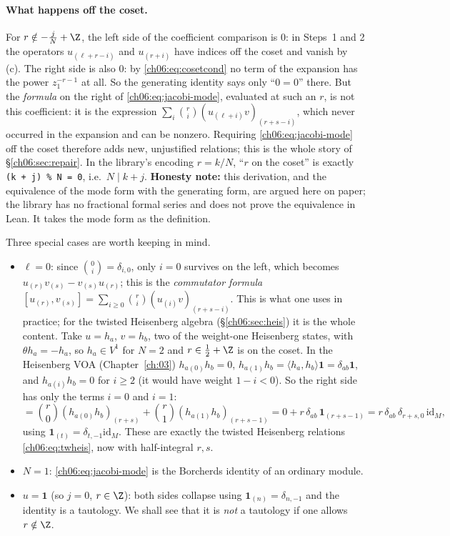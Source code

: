 \paragraph{What happens off the coset.}  For $r\notin-\frac jN+\Z$, the left side of the
coefficient comparison is $0$: in Steps~1 and 2 the operators $u_{(\ell+r-i)}$ and $u_{(r+i)}$ have
indices off the coset and vanish by (c).  The right side is also $0$: by
\eqref{ch06:eq:cosetcond} no term of the expansion has the power $z_1^{-r-1}$ at all.  So the
generating identity says only ``$0=0$'' there.  But the \emph{formula} on the right of
\eqref{ch06:eq:jacobi-mode}, evaluated at such an $r$, is not this coefficient: it is the
expression $\sum_i\binom ri(u_{(\ell+i)}v)_{(r+s-i)}$, which never occurred in the expansion and
can be nonzero.  Requiring \eqref{ch06:eq:jacobi-mode} off the coset therefore adds new,
unjustified relations; this is the whole story of \S\ref{ch06:sec:repair}.  In the library's
encoding $r=k/N$, ``$r$ on the coset'' is exactly \texttt{(k + j) \% N = 0}, i.e.\ $N\mid k+j$.
\textbf{Honesty note:} this derivation, and the equivalence of the mode form with the generating
form, are argued here on paper; the library has no fractional formal series and does not prove the
equivalence in Lean.  It takes the mode form as the definition.

Three special cases are worth keeping in mind.
\begin{itemize}
\item $\ell=0$: since $\binom0i=\delta_{i,0}$, only $i=0$ survives on the left, which becomes
  $u_{(r)}v_{(s)}-v_{(s)}u_{(r)}$; this is the \emph{commutator formula}
  $[u_{(r)},v_{(s)}]=\sum_{i\ge0}\binom ri(u_{(i)}v)_{(r+s-i)}$.  This is what one uses in
  practice; for the twisted Heisenberg algebra (\S\ref{ch06:sec:heis}) it is the whole content.
  Take $u=h_a$, $v=h_b$, two of the weight-one Heisenberg states, with $\theta h_a=-h_a$, so
  $h_a\in V^1$ for $N=2$ and $r\in\frac12+\Z$ is on the coset.  In the Heisenberg VOA
  (Chapter~\ref{ch:03}) $h_{a(0)}h_b=0$, $h_{a(1)}h_b=\langle h_a,h_b\rangle\mathbf 1=
  \delta_{ab}\mathbf 1$, and $h_{a(i)}h_b=0$ for $i\ge2$ (it would have weight $1-i<0$).  So the
  right side has only the terms $i=0$ and $i=1$:
  \begin{equation*}
    [h_{a(r)},h_{b(s)}]=\binom r0(h_{a(0)}h_b)_{(r+s)}+\binom r1(h_{a(1)}h_b)_{(r+s-1)}
    =0+r\,\delta_{ab}\,\mathbf 1_{(r+s-1)}=r\,\delta_{ab}\,\delta_{r+s,0}\,\mathrm{id}_M,
  \end{equation*}
  using $\mathbf 1_{(t)}=\delta_{t,-1}\mathrm{id}_M$.  These are exactly the twisted Heisenberg
  relations \eqref{ch06:eq:twheis}, now with half-integral $r,s$.
\item $N=1$: \eqref{ch06:eq:jacobi-mode} is the Borcherds identity of an ordinary module.
\item $u=\mathbf 1$ (so $j=0$, $r\in\Z$): both sides collapse using $\mathbf 1_{(n)}=\delta_{n,-1}$
  and the identity is a tautology.  We shall see that it is \emph{not} a tautology if one allows
  $r\notin\Z$.
\end{itemize}

